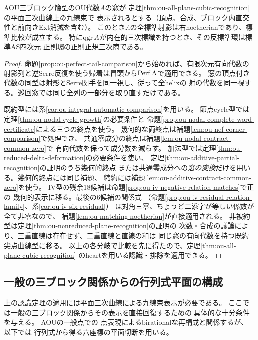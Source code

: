\begin{theorem}[平面三次曲線の九線束表示での比較仮定の除去]
\label{thm:ou-plane-automatic-comparison}
AOU三ブロック箙型のOU代数$A$の窓が
定理\ref{thm:ou-all-plane-cubic-recognition}の平面三次曲線上の九線束で
表示されるとする（頂点、合成、ブロック内直交性と前向きExt消滅を含む）。
このとき$A$の全標準射影は右noetherianであり、標準比較が成立する。
特に$\operatorname{qgr} A$が内在的三次標識を持つとき、その反標準環は標準AS四次元
正則環の正則正規三次商である。
\end{theorem}
\begin{proof}
命題\ref{prop:ou-perfect-tail-comparison}から始めれば、有限次元有向代数の
射影列と逆Serre反復を使う帰着は冒頭から$\operatorname{Perf}\Lambda$で適用できる。
窓の頂点付き代数の同型は射影とSerre関手を同一視し、従って全helixの
射の代数を同一視する。巡回窓では同じ全列の一部分を取り直すだけである。

既約型には系\ref{cor:ou-integral-automatic-comparison}を用いる。
節点cycle型では定理\ref{thm:ou-nodal-cycle-growth}の必要条件と
命題\ref{prop:ou-nodal-complete-word-certificate}による三つの終点を使う。
幾何的な両終点は補題\ref{lem:ou-nef-corner-comparison}で処理でき、
共通零成分の終点は補題\ref{lem:ou-nodal-contract-common-zero}で
有向代数を保って成分数を減らす。
加法型では定理\ref{thm:ou-reduced-delta-deformation}の必要条件を使い、
定理\ref{thm:ou-additive-partial-recognition}の証明のうち幾何的終点
または共通零成分への\emph{窓の変換}だけを用いる。幾何的終点には同じ補題、
縮約には補題\ref{lem:ou-additive-contract-common-zero}を使う。
IV型の残余18候補は命題\ref{prop:ou-iv-negative-relation-matches}で正の
幾何的表示に移る。最後の6候補の関係式
（命題\ref{prop:ou-iv-residual-relation-family}、系\ref{cor:ou-iv-six-residual}）
は対角三零、ちょうど二添字が等しい係数が全て非零なので、
補題\ref{lem:ou-matching-noetherian}が直接適用される。
非被約型は定理\ref{thm:ou-nonreduced-plane-recognition}の証明の
次数・合成の議論により、三重直線は存在せず、二重直線と直線の和は
同じ窓の有向代数を持つ既約尖点曲線型に移る。
以上の各分岐で比較を先に得たので、定理\ref{thm:ou-all-plane-cubic-recognition}
のheartを用いる認識・排除を適用できる。
\end{proof}

\subsection{一般の三ブロック関係からの行列式平面の構成}
\label{subsec:ou-determinantal-plane}
上の認識定理の適用には平面三次曲線による九線束表示が必要である。
ここでは一般の三ブロック関係からその表示を直接回復するための
具体的な十分条件を与える。
AOU\cite[Theorem~1.1, Sections~6--7]{AOU2024}の一般点での
点表現によるbirationalな再構成と関係するが、以下では
行列式から得る六座標の平面切断を用いる。

